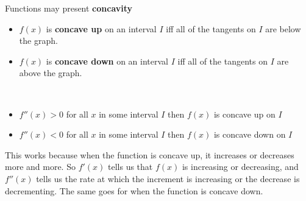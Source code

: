 \documentclass[a4paper]{article}
\begin{document}
\begin{minipage}{0.5\textwidth}
\end{minipage}
\begin{minipage}{0.5\textwidth}
    Functions may present \textbf{concavity}
    \hphantom{ } \\
    \begin{itemize}
        \item \(f(x)\) is \textbf{concave up} on an interval \(I\) iff all of the tangents on \(I\) are below the graph.
        \item \(f(x)\) is \textbf{concave down} on an interval \(I\) iff all of the tangents on \(I\) are above the graph.
    \end{itemize}
    \hphantom{ } \\
    \begin{itemize}
        \item \(f''(x)>0\) for all \(x\) in some interval \(I\) then \(f(x)\) is concave up on \(I\)
        \item \(f''(x)<0\) for all \(x\) in some interval \(I\) then \(f(x)\) is concave down on \(I\)
    \end{itemize}

    This works because when the function is concave up, it increases or decreases more and more. So \(f'(x)\)
    tells us that \(f(x)\) is increasing or decreasing, and \(f''(x)\) tells us the rate at which the increment
    is increasing or the decrease is decrementing. The same goes for when the function is concave down.
\end{minipage}
\end{document}
